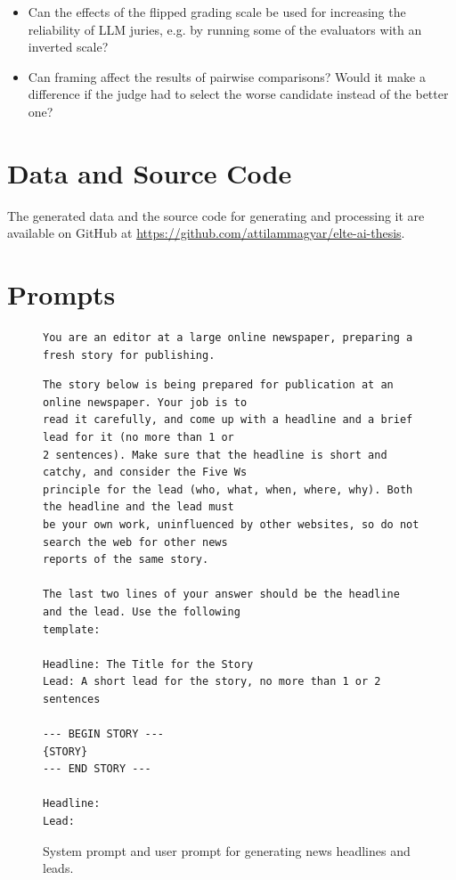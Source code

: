 \documentclass[UTF8,noindent,nohyp,parspace,titlepage,a4paper,12pt]{article}
\begin{document}
      \begin{itemize}
        \item Can the effects of the flipped grading scale be used for
              increasing the reliability of LLM juries, e.g. by running some of
              the evaluators with an inverted scale?

        \item Can framing affect the results of pairwise comparisons? Would it
              make a difference if the judge had to select the worse candidate
              instead of the better one?
      \end{itemize}

\clearpage

  \appendix

  \section{Data and Source Code}

    The generated data and the source code for generating and processing it
    are available on GitHub at \url{https://github.com/attilammagyar/elte-ai-thesis}.

\clearpage

  \section{Prompts}

    \begin{figure}[hbtp]
      \begin{lstlisting}[basicstyle=\scriptsize\sffamily,frame=single,linewidth=\textwidth]
You are an editor at a large online newspaper, preparing a fresh story for publishing.
      \end{lstlisting}
      \begin{lstlisting}[basicstyle=\scriptsize\sffamily,frame=single,linewidth=\textwidth]
The story below is being prepared for publication at an online newspaper. Your job is to
read it carefully, and come up with a headline and a brief lead for it (no more than 1 or
2 sentences). Make sure that the headline is short and catchy, and consider the Five Ws
principle for the lead (who, what, when, where, why). Both the headline and the lead must
be your own work, uninfluenced by other websites, so do not search the web for other news
reports of the same story.

The last two lines of your answer should be the headline and the lead. Use the following
template:

Headline: The Title for the Story
Lead: A short lead for the story, no more than 1 or 2 sentences

--- BEGIN STORY ---
{STORY}
--- END STORY ---

Headline:
Lead:
      \end{lstlisting}
      \caption{%
        System prompt and user prompt for generating news headlines and leads.
      }
      \label{figgennews}
    \end{figure}
\end{document}
